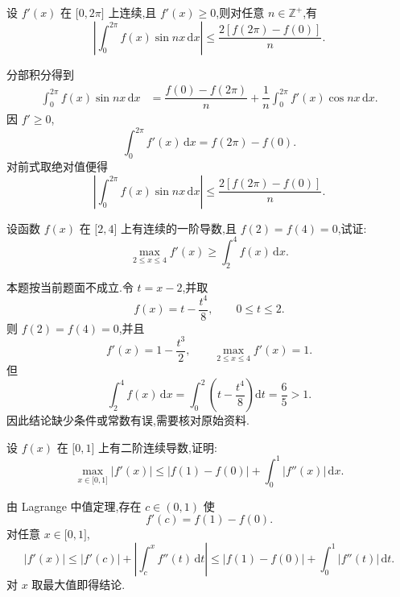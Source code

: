 \begin{example}
    设 $f'(x)$ 在 $\lbrack 0,2\pi\rbrack$ 上连续,且 $f'(x)\geq0$,则对任意 $n\in\mathbb{Z}^+$,有
    \[
        \left|\int_0^{2\pi}f(x)\sin nx\,\mathrm{d}x\right|
        \leq\dfrac{2[f(2\pi)-f(0)]}{n}.
    \]
\end{example}
\exampleblank

\begin{solution}
    分部积分得到
    \[
        \begin{aligned}
            \int_0^{2\pi}f(x)\sin nx\,\mathrm{d}x
             & =
            \dfrac{f(0)-f(2\pi)}{n}
            +\dfrac{1}{n}\int_0^{2\pi}f'(x)\cos nx\,\mathrm{d}x.
        \end{aligned}
    \]
    因 $f'\geq0$,
    \[
        \displaystyle\int_0^{2\pi}f'(x)\,\mathrm{d}x=f(2\pi)-f(0).
    \]
    对前式取绝对值便得
    \[
        \left|\int_0^{2\pi}f(x)\sin nx\,\mathrm{d}x\right|
        \leq\dfrac{2[f(2\pi)-f(0)]}{n}.
    \]
\end{solution}




\begin{example}
    设函数 $f(x)$ 在 $\lbrack 2,4\rbrack$ 上有连续的一阶导数,且 $f(2)=f(4)=0$,试证:
    \[
        \max\limits_{2\leq x\leq4}f'(x)
        \geq\int_2^4f(x)\,\mathrm{d}x.
    \]
\end{example}
\exampleblank

\begin{solution}
    本题按当前题面不成立.令 $t=x-2$,并取
    \[
        f(x)=t-\dfrac{t^4}{8},
        \qquad 0\leq t\leq2.
    \]
    则 $f(2)=f(4)=0$,并且
    \[
        f'(x)=1-\dfrac{t^3}{2},
        \qquad
        \max\limits_{2\leq x\leq4}f'(x)=1.
    \]
    但
    \[
        \displaystyle\int_2^4f(x)\,\mathrm{d}x
        =\int_0^2\left(t-\dfrac{t^4}{8}\right)\mathrm{d}t
        =\dfrac{6}{5}>1.
    \]
    因此结论缺少条件或常数有误,需要核对原始资料.
\end{solution}

\begin{example}
    设 $f(x)$ 在 $\lbrack 0,1\rbrack$ 上有二阶连续导数,证明:
    \[
        \max\limits_{x\in\lbrack 0,1\rbrack}|f'(x)|
        \leq|f(1)-f(0)|+\int_0^1|f''(x)|\,\mathrm{d}x.
    \]
\end{example}
\exampleblank

\begin{solution}
    由 Lagrange 中值定理,存在 $c\in(0,1)$ 使
    \[
        f'(c)=f(1)-f(0).
    \]
    对任意 $x\in\lbrack0,1\rbrack$,
    \[
        |f'(x)|
        \leq|f'(c)|+\left|\int_c^xf''(t)\,\mathrm{d}t\right|
        \leq|f(1)-f(0)|+\int_0^1|f''(t)|\,\mathrm{d}t.
    \]
    对 $x$ 取最大值即得结论.
\end{solution}

